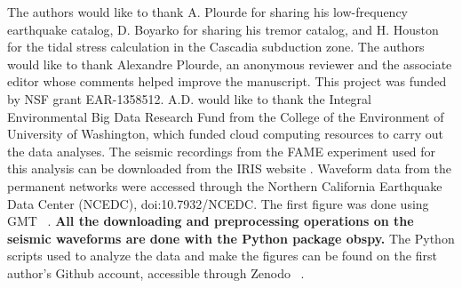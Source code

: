 \documentclass[draft]{agujournal2019}
\begin{document}
%
%
%
%
%
%
%
%


\acknowledgments
The authors would like to thank A. Plourde for sharing his low-frequency earthquake catalog, D. Boyarko for sharing his tremor catalog, and H. Houston for the tidal stress calculation in the Cascadia subduction zone. The authors would like to thank Alexandre Plourde, an anonymous reviewer and the associate editor whose comments helped improve the manuscript. This project was funded by NSF grant EAR-1358512. A.D. would like to thank the Integral Environmental Big Data Research Fund from the College of the Environment of University of Washington, which funded cloud computing resources to carry out the data analyses. The seismic recordings from the FAME experiment used for this analysis can be downloaded from the IRIS website \cite{https://doi.org/10.7914/sn/xq_2007}. Waveform data from the permanent networks were accessed through the Northern California Earthquake Data Center (NCEDC), doi:10.7932/NCEDC. The first figure was done using GMT ~\cite{WES_1991}. \textbf{All the downloading and preprocessing operations on the seismic waveforms are done with the Python package obspy.} The Python scripts used to analyze the data and make the figures can be found on the first author's Github account, accessible through Zenodo ~\cite{ariane_ducellier_2021_5168867}.



%
%





%
%
%
%
%
\end{document}
